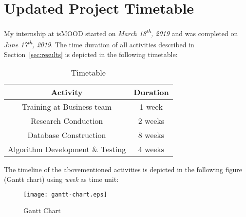 \section{Updated Project Timetable}
\label{sec:timetable}

My internship at isMOOD started
on \emph{March 18\textsuperscript{th}, 2019}
and was completed 
on \emph{June 17\textsuperscript{th}, 2019}.
The time duration of all activities
described in Section~\ref{sec:results}
is depicted in the following timetable:

\begin{table}[ht]
\centering
\begin{tabular}{ |c|c| }
 \hline
 \textbf{Activity} & \textbf{Duration} \\ 
 \hline
 Training at Business team & 1 week \\
 \hline
 Research Conduction & 2 weeks \\ 
 \hline
 Database Construction & 8 weeks \\ 
 \hline
 Algorithm Development \& Testing & 4 weeks \\
 \hline
\end{tabular}
\caption{Timetable}
\label{tab:timetable}
\end{table}

The timeline of the abovementioned activities
is depicted in the following figure (Gantt chart)
using \emph{week} as time unit:

\begin{figure}[ht]
\centering
\texttt{[image: gantt-chart.eps]}
\caption{Gantt Chart}
\label{fig:gantt-chart}
\end{figure}

% 
